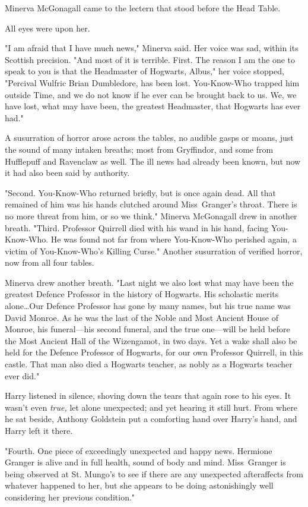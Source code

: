 Minerva McGonagall came to the lectern that stood before the Head Table.

All eyes were upon her.

"I am afraid that I have much news," Minerva said. Her voice was sad, within
its Scottish precision. "And most of it is terrible. First. The reason I am the
one to speak to you is that the Headmaster of Hogwarts, Albus," her voice
stopped, "Percival Wulfric Brian Dumbledore, has been lost. You-Know-Who
trapped him outside Time, and we do not know if he ever can be brought back to
us. We, we have lost, what may have been, the greatest Headmaster, that
Hogwarts has ever had."

A susurration of horror arose across the tables, no audible gasps or moans,
just the sound of many intaken breaths; most from Gryffindor, and some from
Hufflepuff and Ravenclaw as well. The ill news had already been known, but now
it had also been said by authority.

"Second. You-Know-Who returned briefly, but is once again dead. All that
remained of him was his hands clutched around Miss~Granger’s throat. There is
no more threat from him, or so we think." Minerva McGonagall drew in another
breath. "Third. Professor Quirrell died with his wand in his hand, facing
You-Know-Who. He was found not far from where You-Know-Who perished again, a
victim of You-Know-Who’s Killing Curse." Another susurration of verified
horror, now from all four tables.

Minerva drew another breath. "Last night we also lost what may have been the
greatest Defence Professor in the history of Hogwarts. His scholastic merits
alone…Our Defence Professor has gone by many names, but his true name
was David Monroe. As he was the last of the Noble and Most Ancient House of
Monroe, his funeral—his second funeral, and the true one—will be held
before the Most Ancient Hall of the Wizengamot, in two days. Yet a wake shall
also be held for the Defence Professor of Hogwarts, for our own Professor
Quirrell, in this castle. That man also died a Hogwarts teacher, as nobly as a
Hogwarts teacher ever did."

Harry listened in silence, shoving down the tears that again rose to his eyes.
It wasn’t even \emph{true,} let alone unexpected; and yet hearing it still
hurt. From where he sat beside, Anthony Goldstein put a comforting hand over
Harry’s hand, and Harry left it there.

"Fourth. One piece of exceedingly unexpected and happy news. Hermione Granger
is alive and in full health, sound of body and mind. Miss~Granger is being
observed at St. Mungo’s to see if there are any unexpected afteraffects from
whatever happened to her, but she appears to be doing astonishingly well
considering her previous condition."

